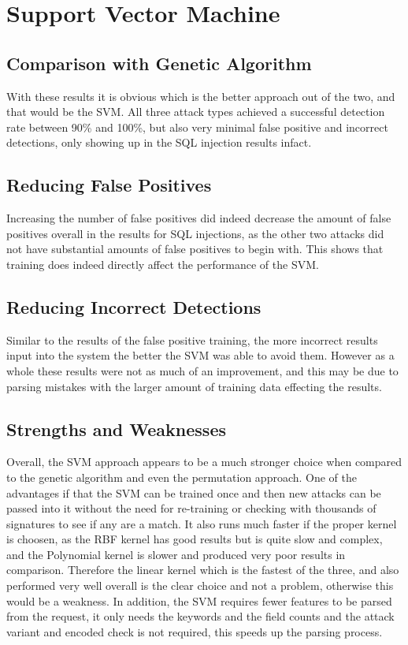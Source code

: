 \section{Support Vector Machine}
\subsection{Comparison with Genetic Algorithm}

With these results it is obvious which is the better approach out of the two, and that would be the SVM.  All three attack types achieved a successful detection rate between 90\% and 100\%, but also very minimal false positive and incorrect detections, only showing up in the SQL injection results infact.  

\subsection{Reducing False Positives}

Increasing the number of false positives did indeed decrease the amount of false positives overall in the results for SQL injections, as the other two attacks did not have substantial amounts of false positives to begin with.  This shows that training does indeed directly affect the performance of the SVM. 

\subsection{Reducing Incorrect Detections}

Similar to the results of the false positive training, the more incorrect results input into the system the better the SVM was able to avoid them.  However as a whole these results were not as much of an improvement, and this may be due to parsing mistakes with the larger amount of training data effecting the results.

\subsection{Strengths and Weaknesses}\label{sec:svmDisadvantages}

Overall, the SVM approach appears to be a much stronger choice when compared to the genetic algorithm and even the permutation approach.  One of the advantages if that the SVM can be trained once and then new attacks can be passed into it without the need for re-training or checking with thousands of signatures to see if any are a match.  It also runs much faster if the proper kernel is choosen, as the RBF kernel has good results but is quite slow and complex, and the Polynomial kernel is slower and produced very poor results in comparison.  Therefore the linear kernel which is the fastest of the three, and also performed very well overall is the clear choice and not a problem, otherwise this would be a weakness.  In addition, the SVM requires fewer features to be parsed from the request, it only needs the keywords and the field counts and the attack variant and encoded check is not required, this speeds up the parsing process.

